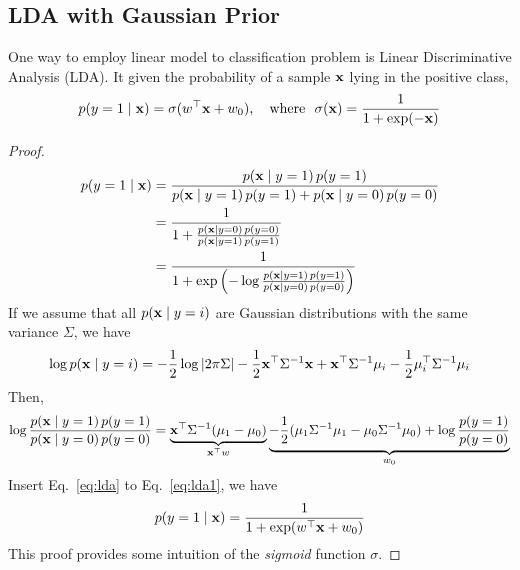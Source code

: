 \subsection{LDA with Gaussian Prior}
\begin{definition}
	One way to employ linear model to classification problem is Linear Discriminative Analysis (LDA). It given the probability of a sample $\mathbf{x}$ lying in the positive class,
	\begin{equation}
		p(y = 1 \mid \mathbf{x}) = \sigma(w^\top \mathbf{x} + w_0), \quad \text{where}\ \  \sigma(\mathbf{x}) = \frac{1}{1 + \exp(-\mathbf{x})}
	\end{equation}
\end{definition}
\begin{proof}
	\begin{align}
		p(y = 1\mid \mathbf{x}) & = \frac{p(\mathbf{x} \mid y = 1)\, p(y = 1)}{p(\mathbf{x} \mid y = 1)\, p(y = 1) + p(\mathbf{x} \mid y = 0)\, p(y = 0)} \\
		& = \frac{1}{1 + \frac{p(\mathbf{x} \mid y = 0)\, p(y = 0)}{p(\mathbf{x} \mid y = 1)\, p(y = 1)}}\\
		& = \frac{1}{1 + \exp\left(-\log  \frac{p(\mathbf{x} \mid y = 1)\, p(y = 1)}{p(\mathbf{x} \mid y = 0)\, p(y = 0)}\right) }\label{eq:lda1}
	\end{align}
If we assume that all $p(\mathbf{x} \mid y=i)$ are Gaussian distributions with the same variance $\Sigma$, we have
\begin{equation}
	\log p(\mathbf{x} \mid y=i) = -\frac{1}{2} \log |2 \pi \Sigma| - \frac{1}{2} \mathbf{x}^\top \Sigma^{-1} \mathbf{x} + \mathbf{x}^\top \Sigma^{-1} \mu_i - \frac{1}{2} \mu_i^\top \Sigma^{-1} \mu_i
\end{equation}
Then, 
\begin{equation}
	\log \frac{p(\mathbf{x} \mid y = 1)\, p(y = 1)}{p(\mathbf{x} \mid y = 0)\, p(y = 0)} = \underbrace{\mathbf{x}^\top \Sigma^{-1}(\mu_1 - \mu_0)}_{\mathbf{x}^\top w} \underbrace{- \frac{1}{2}(\mu_1 \Sigma^{-1} \mu_1 - \mu_0 \Sigma^{-1} \mu_0) + \log \frac{p(y=1)}{p(y=0)}}_{w_0} \label{eq:lda}
\end{equation}
Insert Eq.~\ref{eq:lda} to Eq.~\ref{eq:lda1}, we have
\begin{equation}
	p(y = 1\mid \mathbf{x}) = \frac{1}{1 + \exp(w^\top \mathbf{x} + w_0)}
\end{equation}
This proof provides some intuition of the \textit{sigmoid} function $\sigma$. 
\end{proof}

